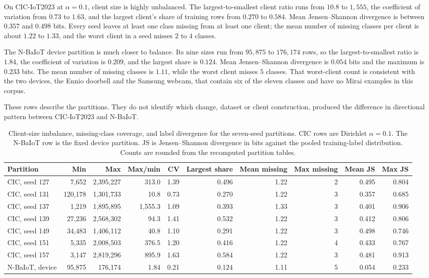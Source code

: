 \documentclass{ieeeaccess}
\begin{document}
On CIC-IoT2023 at $\alpha=0.1$, client size is highly unbalanced. The largest-to-smallest client ratio runs from $10.8$ to $1{,}555$, the coefficient of variation from $0.73$ to $1.63$, and the largest client's share of training rows from $0.270$ to $0.584$. Mean Jensen--Shannon divergence is between $0.357$ and $0.498$ bits. Every seed leaves at least one class missing from at least one client; the mean number of missing classes per client is about $1.22$ to $1.33$, and the worst client in a seed misses $2$ to $4$ classes.

The N-BaIoT device partition is much closer to balance. Its nine sizes run from $95{,}875$ to $176{,}174$ rows, so the largest-to-smallest ratio is $1.84$, the coefficient of variation is $0.209$, and the largest share is $0.124$. Mean Jensen--Shannon divergence is $0.054$ bits and the maximum is $0.233$ bits. The mean number of missing classes is $1.11$, while the worst client misses $5$ classes. That worst-client count is consistent with the two devices, the Ennio doorbell and the Samsung webcam, that contain six of the eleven classes and have no Mirai examples in this corpus.

These rows describe the partitions. They do not identify which change, dataset or client construction, produced the difference in directional pattern between CIC-IoT2023 and N-BaIoT.

\begin{table}[!t]
\centering
\caption{Client-size imbalance, missing-class coverage, and label divergence for the seven-seed partitions. CIC rows are Dirichlet $\alpha=0.1$. The N-BaIoT row is the fixed device partition. JS is Jensen--Shannon divergence in bits against the pooled training-label distribution. Counts are rounded from the recomputed partition tables.}
\label{tab:hetero}
\scriptsize
\begin{tabular}{lrrrrrrrrr}
\hline
Partition & Min & Max & Max/min & CV & Largest share & Mean missing & Max missing & Mean JS & Max JS \\
\hline
CIC, seed 127 & 7,652 & 2,395,227 & 313.0 & 1.39 & 0.496 & 1.22 & 2 & 0.495 & 0.804 \\
CIC, seed 131 & 120,178 & 1,301,733 & 10.8 & 0.73 & 0.270 & 1.22 & 3 & 0.357 & 0.685 \\
CIC, seed 137 & 1,219 & 1,895,895 & 1,555.3 & 1.09 & 0.393 & 1.33 & 3 & 0.401 & 0.906 \\
CIC, seed 139 & 27,236 & 2,568,302 & 94.3 & 1.41 & 0.532 & 1.22 & 3 & 0.412 & 0.806 \\
CIC, seed 149 & 34,483 & 1,406,112 & 40.8 & 1.10 & 0.291 & 1.22 & 3 & 0.498 & 0.746 \\
CIC, seed 151 & 5,335 & 2,008,503 & 376.5 & 1.20 & 0.416 & 1.22 & 4 & 0.433 & 0.767 \\
CIC, seed 157 & 3,147 & 2,819,296 & 895.9 & 1.63 & 0.584 & 1.22 & 3 & 0.481 & 0.913 \\
N-BaIoT, device & 95,875 & 176,174 & 1.84 & 0.21 & 0.124 & 1.11 & 5 & 0.054 & 0.233 \\
\hline
\end{tabular}
\end{table}
\end{document}
